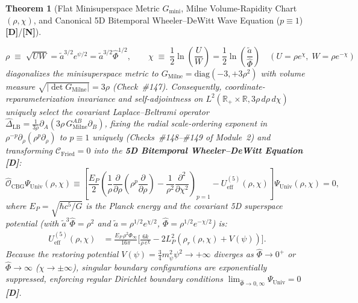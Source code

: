 \documentclass[11pt,a4paper]{article}
\newcommand{\catD}{\textbf{\textcolor{blue!75!black}{[D]}}}
\newcommand{\catN}{\textbf{\textcolor{teal!75!black}{[N]}}}
\newtheorem{theorem}{Theorem}[section]
\theoremstyle{definition}
\theoremstyle{remark}
\begin{document}
\begin{theorem}[Flat Minisuperspace Metric $G_{\text{mini}}$, Milne Volume-Rapidity Chart $(\rho, \chi)$, and Canonical 5D Bitemporal Wheeler--DeWitt Wave Equation ($p \equiv 1$) \catD/\catN]
\begin{enumerate}
  \begin{equation}
    \rho \;\equiv\; \sqrt{U W} = \tilde{a}^{3/2}e^{\psi/2} = \tilde{a}^{3/2}\hat{\Phi}^{1/2}, \qquad
    \chi \;\equiv\; \frac{1}{2}\ln\!\left(\frac{U}{W}\right) = \frac{1}{2}\ln\!\left(\frac{\tilde{a}}{\hat{\Phi}}\right) \quad \left(U = \rho e^\chi, \; W = \rho e^{-\chi}\right)
    \label{eq:milne_minisuperspace_coords}
  \end{equation}
  diagonalizes the minisuperspace metric to $G_{\text{Milne}} = \text{diag}(-3, +3\rho^2)$ with volume measure $\sqrt{|\det G_{\text{Milne}}|} = 3\rho$ (Check~\#147). Consequently, coordinate-reparameterization invariance and self-adjointness on $L^2(\mathbb{R}_+ \times \mathbb{R}, 3\rho\,d\rho\,d\chi)$ uniquely select the covariant Laplace--Beltrami operator $\hat{\Delta}_{\text{LB}} = \frac{1}{3\rho}\partial_A(3\rho\,G_{\text{Milne}}^{AB}\partial_B)$, fixing the radial scale-ordering exponent in $\rho^{-p}\partial_\rho(\rho^p\partial_\rho)$ to $p \equiv 1$ uniquely (Checks~\#148--\#149 of Module~2) and transforming $\mathcal{C}_{\text{Fried}} = 0$ into the \textbf{5D Bitemporal Wheeler--DeWitt Equation} \catD:
  \begin{equation}
    \hat{\mathcal{O}}_{\text{CBG}}\Psi_{\text{Univ}}(\rho, \chi) \equiv \left[\frac{E_P}{2}\left(\frac{1}{\rho}\frac{\partial}{\partial\rho}\!\left(\rho^p\frac{\partial}{\partial\rho}\right) - \frac{1}{\rho^2}\frac{\partial^2}{\partial\chi^2}\right)_{p=1} - U_{\text{eff}}^{(5)}(\rho, \chi)\right]\Psi_{\text{Univ}}(\rho, \chi) = 0,
    \label{eq:exact_5d_wdw_equation}
  \end{equation}
  where $E_P = \sqrt{\hbar c^5/G}$ is the Planck energy and the covariant 5D superspace potential (with $\tilde{a}^3\hat{\Phi} = \rho^2$ and $\tilde{a} = \rho^{1/2}e^{\chi/2}$, $\hat{\Phi} = \rho^{1/2}e^{-\chi/2}$) is:
  \begin{equation}
  \begin{aligned}
    U_{\text{eff}}^{(5)}(\rho, \chi) &= \frac{E_P\,\rho^2\Phi_\infty}{16\pi}\Bigg[\frac{6k}{\rho\,e^\chi} - 2 L_P^2\left(\rho_r(\rho, \chi) + V(\psi)\right)\Bigg].
  \end{aligned}
  \label{eq:wdw_superspace_potential}
  \end{equation}
  Because the restoring potential $V(\psi) = \frac{3}{4}m_{\psi}^2\psi^2 \to +\infty$ diverges as $\hat{\Phi} \to 0^+$ or $\hat{\Phi} \to \infty$ ($\chi \to \pm\infty$), singular boundary configurations are exponentially suppressed, enforcing regular Dirichlet boundary conditions $\lim_{\hat{\Phi}\to 0,\infty}\Psi_{\text{Univ}} = 0$ \catD.

\end{enumerate}
\end{theorem}
\end{document}
